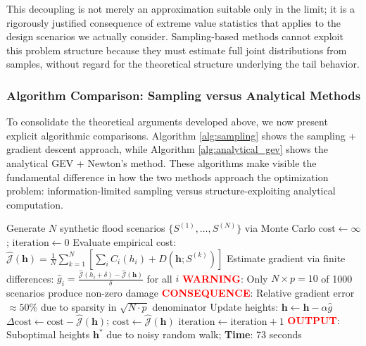 \documentclass[review]{elsarticle}
\begin{document}
This decoupling is not merely an approximation suitable only in the limit; it is a rigorously justified consequence of extreme value statistics that applies to the design scenarios we actually consider. Sampling-based methods cannot exploit this problem structure because they must estimate full joint distributions from samples, without regard for the theoretical structure underlying the tail behavior.

\subsubsection{Algorithm Comparison: Sampling versus Analytical Methods}

To consolidate the theoretical arguments developed above, we now present explicit algorithmic comparisons. Algorithm \ref{alg:sampling} shows the sampling + gradient descent approach, while Algorithm \ref{alg:analytical_gev} shows the analytical GEV + Newton's method. These algorithms make visible the fundamental difference in how the two methods approach the optimization problem: information-limited sampling versus structure-exploiting analytical computation.

\begin{algorithm}[ht]
\caption{Sampling-Based Gradient Descent for Seawall Optimization}
\label{alg:sampling}
\begin{algorithmic}[1]
\State Generate $N$ synthetic flood scenarios $\{S^{(1)}, \ldots, S^{(N)}\}$ via Monte Carlo
\State $\text{cost} \leftarrow \infty$; $\text{iteration} \leftarrow 0$
  \State Evaluate empirical cost: $\hat{\mathcal{J}}(\mathbf{h}) = \frac{1}{N} \sum_{k=1}^{N} [\sum_i C_i(h_i) + D(\mathbf{h}; S^{(k)})]$
  \State Estimate gradient via finite differences: $\hat{g}_i = \frac{\hat{\mathcal{J}}(h_i + \delta) - \hat{\mathcal{J}}(\mathbf{h})}{\delta}$ for all $i$
  \State \textcolor{red}{\textbf{WARNING}}: Only $N \times p = 10$ of 1000 scenarios produce non-zero damage
  \State \textcolor{red}{\textbf{CONSEQUENCE}}: Relative gradient error $\approx 50\%$ due to sparsity in $\sqrt{N \cdot p}$ denominator
  \State Update heights: $\mathbf{h} \leftarrow \mathbf{h} - \alpha \hat{g}$
  \State $\Delta \text{cost} \leftarrow \text{cost} - \hat{\mathcal{J}}(\mathbf{h})$; $\text{cost} \leftarrow \hat{\mathcal{J}}(\mathbf{h})$
  \State $\text{iteration} \leftarrow \text{iteration} + 1$
\EndWhile
\State \textcolor{red}{\textbf{OUTPUT}}: Suboptimal heights $\mathbf{h}^*$ due to noisy random walk; \textbf{Time}: 73 seconds
\end{algorithmic}
\end{algorithm}
\end{document}
